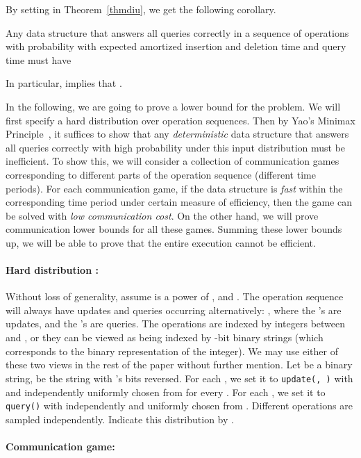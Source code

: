 \documentclass[11pt]{article}
\begin{document}
By setting  in Theorem~\ref{thmdiu}, we get the following corollary. 
\begin{corollary}\label{coldiu}
Any \diu{} data structure that answers all queries correctly in a sequence of  operations with probability  with expected amortized insertion and deletion time  and query time  must have 

In particular,  implies that . 
\end{corollary}

In the following, we are going to prove a lower bound for the \bps{} problem. We will first specify a hard distribution over operation sequences. Then by Yao's Minimax Principle~\cite{Yao77}, it suffices to show that any \emph{deterministic} data structure that answers all queries correctly with high probability under this input distribution must be inefficient. To show this, we will consider a collection of communication games corresponding to different parts of the operation sequence (different time periods). For each communication game, if the data structure is \emph{fast} within the corresponding time period under certain measure of efficiency, then the game can be solved with \emph{low communication cost}. On the other hand, we will prove communication lower bounds for all these games. Summing these lower bounds up, we will be able to prove that the entire execution cannot be efficient. 

\paragraph*{Hard distribution :}

Without loss of generality, assume  is a power of , and . The operation sequence will always have  updates and  queries occurring alternatively: , where the 's are updates, and the 's are queries. The operations are indexed by integers between  and , or they can be viewed as being indexed by -bit binary strings (which corresponds to the binary representation of the integer). We may use either of these two views in the rest of the paper without further mention. Let  be a binary string,  be the string with 's bits reversed. For each , we set it to \verb+update(+\verb+, +\verb+)+ with  and  independently uniformly chosen from  for every . For each , we set it to \verb+query(+\verb+)+ with  independently and uniformly chosen from . Different operations are sampled independently. Indicate this distribution by . 

\paragraph*{Communication game:}
\end{document}
